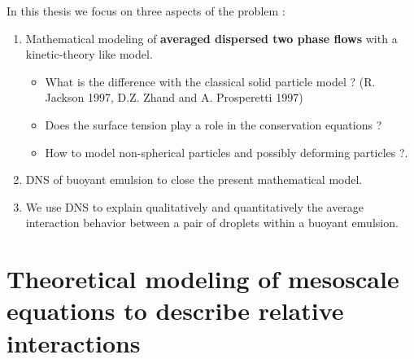 \documentclass{sintefbeamer}
\begin{document}
\begin{frame}
  {In this thesis we focus on three aspects of the problem :}
  \Large
  \begin{enumerate}
    \item Mathematical modeling of \textbf{averaged dispersed two phase flows} with a kinetic-theory like model. 
    \begin{itemize}
      \item What is the difference with the classical solid particle model ? (R. Jackson 1997, D.Z. Zhand and A. Prosperetti 1997)
      \item Does the surface tension play a role in the conservation equations ? 
      \item How to model non-spherical particles and possibly deforming particles ?. 
    \end{itemize}  
    \item DNS of buoyant emulsion to close the present mathematical model. 
    \item We use DNS to explain qualitatively and quantitatively the average interaction behavior between a pair of droplets within a buoyant emulsion. 
  \end{enumerate}
\end{frame}


\section{Theoretical modeling of mesoscale equations to describe relative interactions}
\section*{}
\end{document}
